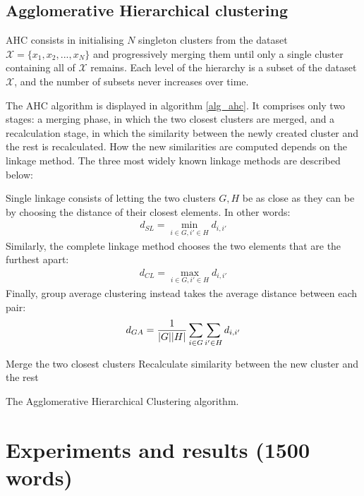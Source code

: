 \documentclass[pdftex,11pt,a4paper]{article}
\theoremstyle{definition}
\theoremstyle{remark}
\DeclarePairedDelimiter\abs{\lvert}{\rvert}%
\begin{document}
\subsection{Agglomerative Hierarchical clustering}
AHC consists in initialising $N$ singleton clusters from the dataset $\mathcal{X} = \{x_1, x_2, ..., x_N\}$ and progressively merging them until only a single cluster containing all of $\mathcal{X}$ remains. Each level of the hierarchy is a subset of the dataset $\mathcal{X}$, and the number of subsets never increases over time.
\par The AHC algorithm is displayed in algorithm \ref{alg_ahc}. It comprises only two stages: a merging phase, in which the two closest clusters are merged, and a recalculation stage, in which the similarity between the newly created cluster and the rest is recalculated. How the new similarities are computed depends on the linkage method. The three most widely known linkage methods \cite{hastie2008} are described below:
\par Single linkage consists of letting the two clusters $G, H$ be as close as they can be by choosing the distance of their closest elements. In other words:
\begin{align*}
d_{SL} = \min_{i \in G, i' \in H} d_{i, i'}
\end{align*}
Similarly, the complete linkage method chooses the two elements that are the furthest apart:
\begin{align*}
d_{CL} = \max_{i \in G, i' \in H} d_{i, i'}
\end{align*}
Finally, group average clustering instead takes the average distance between each pair:
\begin{align*}
d_{GA} = \frac{1}{\abs{G}\abs{H}}\sum_{i\in G}\sum_{i'\in H}d_{i, i'}
\end{align*}
\begin{algorithm}
\begin{algorithmic}[1]
\Repeat
\State Merge the two closest clusters
\State Recalculate similarity between the new cluster and the rest
\EndFunction
\caption{The Agglomerative Hierarchical Clustering algorithm.}\label{alg_ahc}
\end{algorithmic}
\end{algorithm}

\section{Experiments and results (1500 words)}
\end{document}
